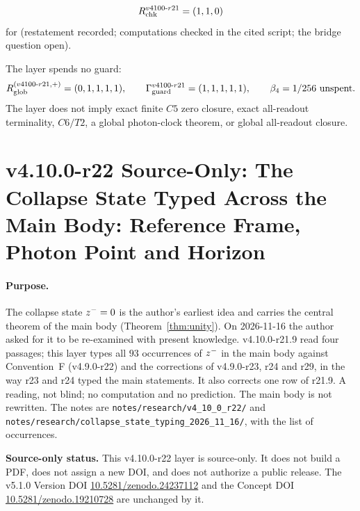 \[
R_{\rm chk}^{v4100\text{-}r21}=(1,1,0)
\]
for (restatement recorded; computations checked in the cited script; the bridge question open).

The layer spends no guard:
\[
R_{\rm glob}^{(v4100\text{-}r21,+)}=(0,1,1,1,1),
\qquad
\Gamma_{\rm guard}^{v4100\text{-}r21}=(1,1,1,1,1),
\qquad
\beta_4=1/256\ \text{unspent}.
\]
The layer does not imply exact finite \(C5\) zero closure, exact all-readout terminality, \(C6/T2\), a global photon-clock theorem,
or global all-readout closure.

\clearpage
\section*{v4.10.0-r22 Source-Only: The Collapse State Typed Across the Main Body: Reference Frame, Photon Point and Horizon}
\label{sec:v4100-r22-collapse-state}

\paragraph{Purpose.}
The collapse state \(z^-=0\) is the author's earliest idea and carries the central theorem of the main body
(Theorem~\ref{thm:unity}).  On 2026-11-16 the author asked for it to be re-examined with present knowledge.  v4.10.0-r21.9 read four
passages; this layer types all \(93\) occurrences of \(z^-\) in the main body against Convention~F (v4.9.0-r22) and the
corrections of v4.9.0-r23, r24 and r29, in the way r23 and r24 typed the main statements.  It also corrects one row of r21.9.  A
reading, not blind; no computation and no prediction.  The main body is not rewritten.  The notes are
\texttt{notes/\allowbreak research/\allowbreak v4\_10\_0\_r22/} and
\texttt{notes/\allowbreak research/\allowbreak collapse\_state\_typing\_2026\_11\_16/}, with the list of occurrences.

\noindent\textbf{Source-only status.}
This v4.10.0-r22 layer is source-only.  It does not build a PDF, does not assign a new DOI,
and does not authorize a public release.  The v5.1.0 Version DOI
\href{https://doi.org/10.5281/zenodo.24237112}{10.5281/zenodo.24237112} and the Concept DOI
\href{https://doi.org/10.5281/zenodo.19210728}{10.5281/zenodo.19210728} are unchanged by it.

